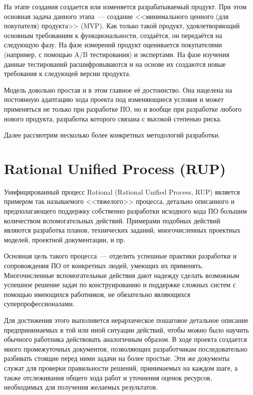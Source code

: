 \documentclass{../../text-style}
\begin{document}
На этапе создания создается или изменяется разрабатываемый продукт. При этом основная задача данного этапа~--- создание <<минимального ценного (для покупателя) продукта>> (MVP). Как только такой продукт, удовлетворяющий основным требованиям к функциональности, создаётся, он передаётся на следующую фазу. На фазе измерений продукт оценивается покупателями (например, с помощью A/B тестирования) и экспертами. На фазе изучения данные тестирований расшифровываются и на основе их создаются новые требования к следующей версии продукта.

Модель довольно простая и в этом главное её достоинство. Она нацелена на постоянную адаптацию хода проекта под изменяющиеся условия и может применяться не только при разработке ПО, но и вообще при разработке любого нового продукта, разработка которого связана с высокой степенью риска.

Далее рассмотрим несколько более конкретных методологий разработки. 

\section{Rational Unified Process (RUP)}

Унифицированный процесс Rational (Rational Unified Process, RUP) является примером так называемого <<тяжелого>> процесса, детально описанного и предполагающего поддержку собственно разработки исходного кода ПО большим количеством вспомогательных действий. Примерами подобных действий являются разработка планов, технических заданий, многочисленных проектных моделей, проектной документации, и пр.

Основная цель такого процесса~--- отделить успешные практики разработки и сопровождения ПО от конкретных людей, умеющих их применять. Многочисленные вспомогательные действия дают надежду сделать возможным успешное решение задач по конструированию и поддержке сложных систем с помощью имеющихся работников, не обязательно являющихся суперпрофессионалами.

Для достижения этого выполняется иерархическое пошаговое детальное описание предпринимаемых в той или иной ситуации действий, чтобы можно было научить обычного работника действовать аналогичным образом. В ходе проекта создается много промежуточных документов, позволяющих разработчикам последовательно разбивать стоящие перед ними задачи на более простые. Эти же документы служат для проверки правильности решений, принимаемых на каждом шаге, а также отслеживания общего хода работ и уточнения оценок ресурсов, необходимых для получения желаемых результатов.
\end{document}
